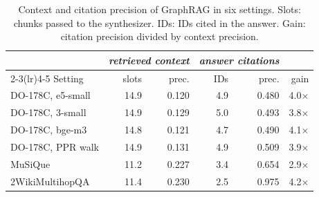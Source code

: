 \begin{table}[t]
  \centering
  \caption{Context and citation precision of GraphRAG in six settings. Slots: chunks passed to the synthesizer. IDs: IDs cited in the answer. Gain: citation precision divided by context precision.}
  \label{tab:pathology}
  \small
  \setlength{\tabcolsep}{4pt}
  \begin{tabular}{l rr rr r}
    \toprule
    & \multicolumn{2}{c}{\textit{retrieved context}} & \multicolumn{2}{c}{\textit{answer citations}} & \\
    \cmidrule(lr){2-3}\cmidrule(lr){4-5}
    Setting & slots & prec. & IDs & prec. & gain \\
    \midrule
    DO-178C, e5-small     & 14.9 & 0.120 & 4.9 & 0.480 & 4.0$\times$ \\
    DO-178C, 3-small      & 14.9 & 0.129 & 5.0 & 0.493 & 3.8$\times$ \\
    DO-178C, bge-m3       & 14.8 & 0.121 & 4.7 & 0.490 & 4.1$\times$ \\
    DO-178C, PPR walk     & 14.9 & 0.131 & 4.9 & 0.509 & 3.9$\times$ \\
    MuSiQue               & 11.2 & 0.227 & 3.4 & 0.654 & 2.9$\times$ \\
    2WikiMultihopQA       & 11.4 & 0.230 & 2.5 & 0.975 & 4.2$\times$ \\
    \bottomrule
  \end{tabular}
\end{table}
